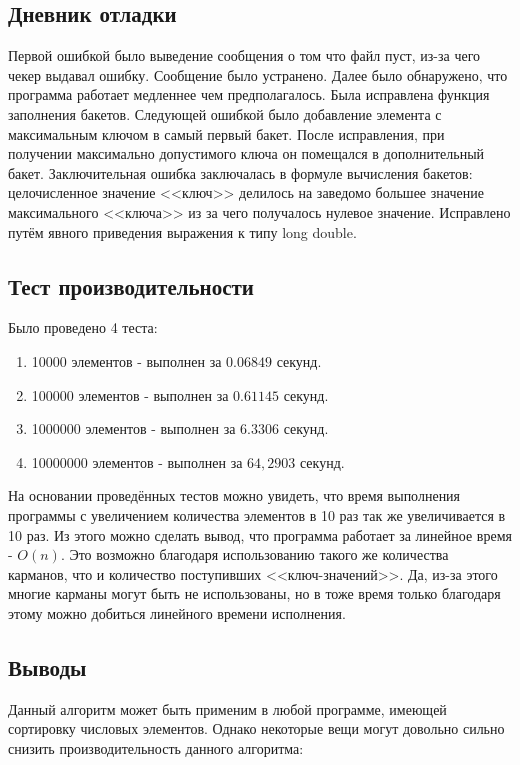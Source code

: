 \documentclass[12pt]{article}
\begin{document}
\subsection*{Дневник отладки}

Первой ошибкой было выведение сообщения о том что файл пуст, из-за чего чекер выдавал ошибку. 
Сообщение было устранено. 
Далее было обнаружено, что программа работает медленнее чем предполагалось. 
Была исправлена функция заполнения бакетов. 
Следующей ошибкой было добавление элемента с максимальным ключом в самый первый бакет.
После исправления, при получении максимально допустимого ключа он помещался в дополнительный бакет. 
Заключительная ошибка заключалась в формуле вычисления бакетов: целочисленное значение <<ключ>> делилось на заведомо большее значение максимального <<ключа>> из за чего получалось нулевое значение. 
Исправлено путём явного приведения выражения к типу long double.

\subsection*{Тест производительности}

Было проведено 4 теста:
\begin{enumerate}
\item 10000 элементов - выполнен за $0.06849$ секунд.
\item 100000 элементов - выполнен за $0.61145$ секунд.
\item 1000000 элементов - выполнен за $6.3306$ секунд.
\item 10000000 элементов - выполнен за $64,2903$ секунд.
\end{enumerate}

На основании проведённых тестов можно увидеть, что время выполнения программы с увеличением количества элементов в 10 раз так же увеличивается в 10 раз.
Из этого можно сделать вывод, что программа работает за линейное время - $O(n)$. 
Это возможно благодаря использованию такого же количества карманов, что и количество поступивших <<ключ-значений>>. 
Да, из-за этого многие карманы могут быть не использованы, но в тоже время только благодаря этому можно добиться линейного времени исполнения.

\subsection*{Выводы}

Данный алгоритм может быть применим в любой программе, имеющей сортировку числовых элементов.
Однако некоторые вещи могут довольно сильно снизить производительность данного алгоритма:
\end{document}
